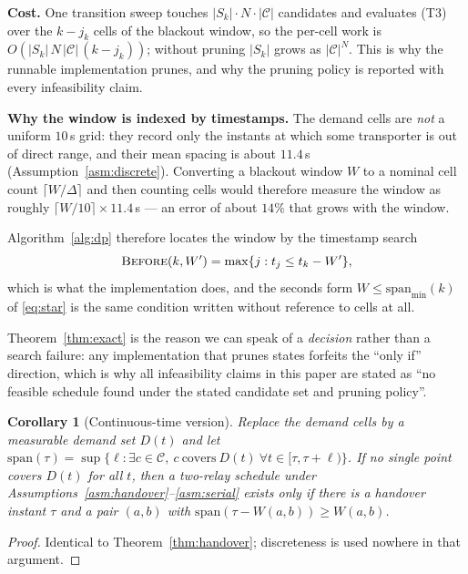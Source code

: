 \documentclass[11pt]{article}
\theoremstyle{dshplain}
\newtheorem{corollary}[theorem]{Corollary}
\theoremstyle{dshdefn}
\begin{document}
\noindent\textbf{Cost.} One transition sweep touches $|S_k|\cdot N\cdot|\mathcal{C}|$
candidates and evaluates (T3) over the $k-j_k$ cells of the blackout window, so
the per-cell work is $O(|S_k|\,N\,|\mathcal{C}|\,(k-j_k))$; without pruning
$|S_k|$ grows as $|\mathcal{C}|^{N}$. This is why the runnable implementation
prunes, and why the pruning policy is reported with every infeasibility claim.

{\sloppy\noindent\textbf{Why the window is indexed by timestamps.} The demand cells are
\emph{not} a uniform $10$\,s grid: they record only the instants at which some
transporter is out of direct range, and their mean spacing is about $11.4$\,s
(Assumption~\ref{asm:discrete}). Converting a blackout window $W$ to a nominal
cell count $\lceil W/\Delta\rceil$ and then counting cells would therefore
measure the window as roughly $\lceil W/10\rceil\times 11.4$\,s --- an error of
about $14\%$ that grows with the window.}\par Algorithm~\ref{alg:dp} therefore
locates the window by the timestamp search $$\textsc{Before}(k,W')=\max\{j:
t_j\le t_k-W'\},$$ which is what the implementation does, and the seconds form
$W\le\mathrm{span}_{\min}(k)$ of \eqref{eq:star} is the same condition written
without reference to cells at all.

\noindent Theorem~\ref{thm:exact} is the reason we can speak of a
\emph{decision} rather than a search failure: any implementation that prunes
states forfeits the ``only if'' direction, which is why all infeasibility claims
in this paper are stated as ``no feasible schedule found under the stated
candidate set and pruning policy''.

\begin{corollary}[Continuous-time version]
\label{cor:continuous}
Replace the demand cells by a measurable demand set $D(t)$ and let
$\mathrm{span}(\tau)=\sup\{\ell:\exists c\in\mathcal{C},\ c\ \text{covers}\
D(t)\ \forall t\in[\tau,\tau+\ell)\}$. If no single point covers
$D(t)$ for all $t$, then a two-relay schedule under
Assumptions~\ref{asm:handover}--\ref{asm:serial} exists only if there is a handover instant $\tau$ and a pair
$(a,b)$ with $\mathrm{span}(\tau-W(a,b))\ge W(a,b)$.
\end{corollary}
\begin{proof}
Identical to Theorem~\ref{thm:handover}; discreteness is used nowhere in that
argument.
\end{proof}
\end{document}
